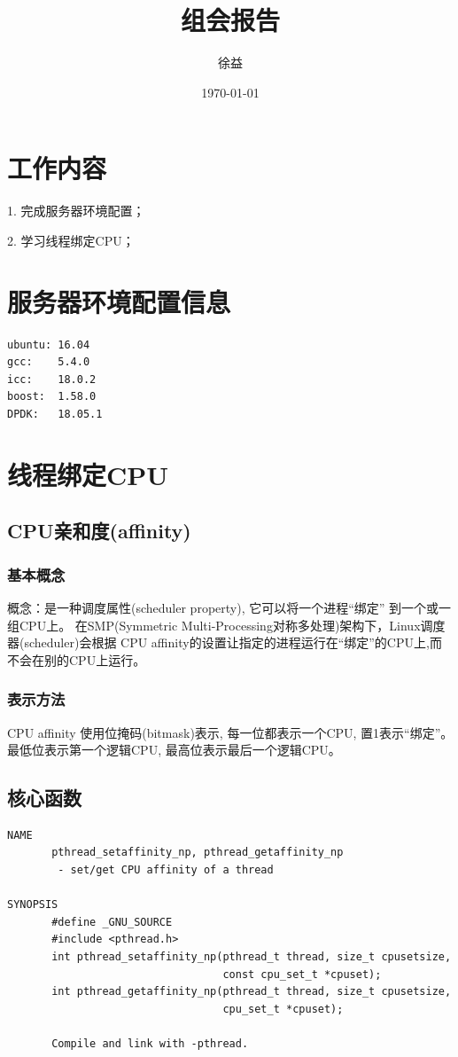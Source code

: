 \documentclass{article}
\title{组会报告}
\author{徐益}
\date{\today}
\begin{document}
\maketitle


\section{工作内容} 
1. 完成服务器环境配置；

2. 学习线程绑定CPU；

\section{服务器环境配置信息}
\lstset{language=C++}
\begin{lstlisting}
ubuntu: 16.04
gcc:    5.4.0
icc:    18.0.2
boost:  1.58.0
DPDK:   18.05.1
\end{lstlisting}

\section{线程绑定CPU}
\subsection{CPU亲和度(affinity)}
\subsubsection{基本概念}
概念：是一种调度属性(scheduler property), 它可以将一个进程“绑定” 到一个或一组CPU上。
在SMP(Symmetric Multi-Processing对称多处理)架构下，Linux调度器(scheduler)会根据
CPU affinity的设置让指定的进程运行在“绑定”的CPU上,而不会在别的CPU上运行。
\subsubsection{表示方法}
CPU affinity 使用位掩码(bitmask)表示, 每一位都表示一个CPU, 置1表示“绑定”。
最低位表示第一个逻辑CPU, 最高位表示最后一个逻辑CPU。

\subsection{核心函数}
\lstset{language=C++}
\begin{lstlisting}
NAME
	   pthread_setaffinity_np, pthread_getaffinity_np
	    - set/get CPU affinity of a thread

SYNOPSIS
       #define _GNU_SOURCE
       #include <pthread.h>
       int pthread_setaffinity_np(pthread_t thread, size_t cpusetsize,
                                  const cpu_set_t *cpuset);
       int pthread_getaffinity_np(pthread_t thread, size_t cpusetsize,
                                  cpu_set_t *cpuset);

       Compile and link with -pthread.
\end{lstlisting}
\end{document}
